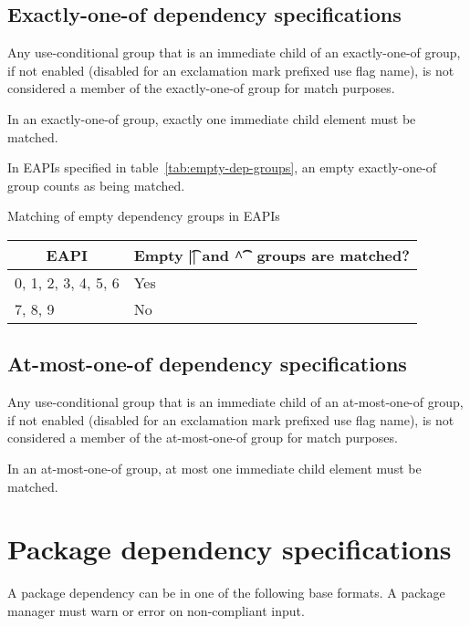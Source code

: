 \subsection{Exactly-one-of dependency specifications}

Any use-conditional group that is an immediate child of an exactly-one-of group, if not enabled
(disabled for an exclamation mark prefixed use flag name), is not considered a member of the
exactly-one-of group for match purposes.

In an exactly-one-of group, exactly one immediate child element must be matched.

In EAPIs specified in table~\ref{tab:empty-dep-groups}, an empty exactly-one-of group counts as
being matched.

\begin{centertable}{Matching of empty dependency groups in EAPIs}
    \label{tab:empty-dep-groups}
    \begin{tabular}{ll}
      \toprule
      \multicolumn{1}{c}{\textbf{EAPI}} &
      \multicolumn{1}{c}{\textbf{Empty \t{||} and \t{\textasciicircum\textasciicircum} groups
        are matched?}} \\
      \midrule
      0, 1, 2, 3, 4, 5, 6 & Yes \\
      7, 8, 9             & No  \\
      \bottomrule
    \end{tabular}
\end{centertable}

\subsection{At-most-one-of dependency specifications}

Any use-conditional group that is an immediate child of an at-most-one-of group, if not enabled
(disabled for an exclamation mark prefixed use flag name), is not considered a member of the
at-most-one-of group for match purposes.

In an at-most-one-of group, at most one immediate child element must be matched.

\section{Package dependency specifications}

A package dependency can be in one of the following base formats. A package manager must warn or
error on non-compliant input.


